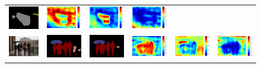 \documentclass[10pt,twocolumn,letterpaper]{article}
\begin{document}
\begin{figure}
\begin{tabular}{c c c c c c}
   \includegraphics[height=0.1\linewidth]{fig/coco/res_sharenet/COCO_val2014_000000000923.png} &
   \includegraphics[height=0.1\linewidth]{fig/coco/att1/COCO_val2014_000000000923.pdf} &
   \includegraphics[height=0.1\linewidth]{fig/coco/att2/COCO_val2014_000000000923.pdf} &
   \includegraphics[height=0.1\linewidth]{fig/coco/att3/COCO_val2014_000000000923.pdf} \\
   \includegraphics[height=0.09\linewidth]{fig/coco/img/COCO_val2014_000000020774.jpg} &
   \includegraphics[height=0.09\linewidth]{fig/coco/res_baseline/COCO_val2014_000000020774.png} &
   \includegraphics[height=0.09\linewidth]{fig/coco/res_sharenet/COCO_val2014_000000020774.png} &
   \includegraphics[height=0.09\linewidth]{fig/coco/att1/COCO_val2014_000000020774.pdf} &
   \includegraphics[height=0.09\linewidth]{fig/coco/att2/COCO_val2014_000000020774.pdf} &
   \includegraphics[height=0.09\linewidth]{fig/coco/att3/COCO_val2014_000000020774.pdf} \\

\end{tabular}
\end{figure}
\end{document}
